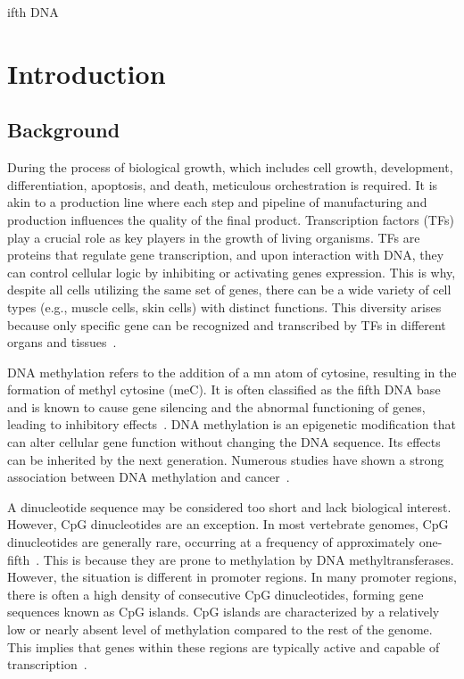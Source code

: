 \documentclass{PHlab-thesis}
\begin{document}



\printnomenclature[5cm]

\newpage
\setcounter{page}{1}
ifth DNA


\chapter{Introduction}
\section{Background}
During the process of biological growth, which includes cell growth, development, differentiation, apoptosis, and death, meticulous orchestration is required. It is akin to a production line where each step and pipeline of manufacturing and production influences the quality of the final product. Transcription factors (TFs) play a crucial role as key players in the growth of living organisms. TFs are proteins that regulate gene transcription, and upon interaction with DNA, they can control cellular logic by inhibiting or activating genes expression. This is why, despite all cells utilizing the same set of genes, there can be a wide variety of cell types (e.g., muscle cells, skin cells) with distinct functions. This diversity arises because only specific gene can be recognized and transcribed by TFs in different organs and tissues~\cite{lambert2018human}.

DNA methylation refers to the addition of a mn atom of cytosine, resulting in the formation of methyl cytosine (meC). It is often classified as the fifth DNA base~\cite{Listerfifthbase2009, Vinermethylsensitive2016} and is known to cause gene silencing and the abnormal functioning of genes, leading to inhibitory effects~\cite{Jones2012DNAmethylationislands}. DNA methylation is an epigenetic modification that can alter cellular gene function without changing the DNA sequence. Its effects can be inherited by the next generation. Numerous studies have shown a strong association between DNA methylation and cancer~\cite{KeithDNAmethyl2005, Feinberg1983Hypomethylation}.

A dinucleotide sequence may be considered too short and lack biological interest. However, CpG dinucleotides are an exception. In most vertebrate genomes, CpG dinucleotides are generally rare, occurring at a frequency of approximately one-fifth~\cite{Saxonov2006}. This is because they are prone to methylation by DNA methyltransferases. However, the situation is different in promoter regions. In many promoter regions, there is often a high density of consecutive CpG dinucleotides, forming gene sequences known as CpG islands. CpG islands are characterized by a relatively low or nearly absent level of methylation compared to the rest of the genome. This implies that genes within these regions are typically active and capable of transcription~\cite{Deaton2011CpG}.
\end{document}
